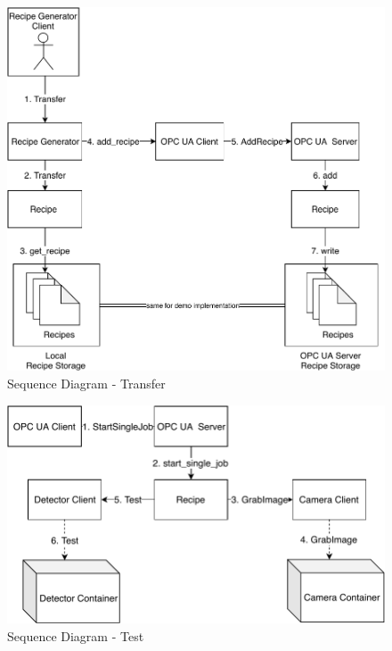 \begin{figure}[ht]
	\centering
  \includegraphics[width=\textwidth]{img/SequenceDiagram-Transfer.pdf}
	\caption{Sequence Diagram - Transfer}
	\label{fig:SequenceDiagram-Transfer}
\end{figure}

\begin{figure}[ht]
	\centering
  \includegraphics[width=\textwidth]{img/SequenceDiagram-Test.pdf}
	\caption{Sequence Diagram - Test}
	\label{fig:SequenceDiagram-Test}
\end{figure}


